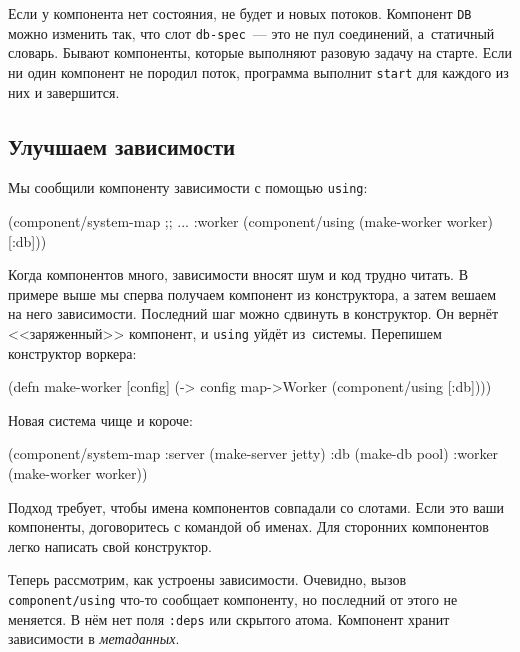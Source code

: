Если у компонента нет состояния, не будет и новых потоков. Компонент \verb|DB|
можно изменить так, что слот \verb|db-spec|~--- это не пул соединений, а~статичный
словарь. Бывают компоненты, которые выполняют разовую задачу на старте. Если ни
один компонент не породил поток, программа выполнит \verb|start| для каждого из
них и завершится.

\subsection{Улучшаем зависимости}


Мы сообщили компоненту зависимости с помощью \verb|using|:

\begin{english}
  \begin{clojure}
(component/system-map
 ;; ...
 :worker (component/using
          (make-worker worker) [:db]))
  \end{clojure}
\end{english}

Когда компонентов много, зависимости вносят шум и код трудно читать. В примере
выше мы сперва получаем компонент из конструктора, а затем вешаем на него
зависимости. Последний шаг можно сдвинуть в конструктор. Он вернёт
<<заряженный>> компонент, и \verb|using| уйдёт из~системы. Перепишем конструктор
воркера:

\begin{english}
  \begin{clojure}
(defn make-worker [config]
  (-> config map->Worker (component/using [:db])))
  \end{clojure}
\end{english}

\noindent
Новая система чище и короче:

\begin{english}
  \begin{clojure}
(component/system-map
 :server (make-server jetty)
 :db     (make-db pool)
 :worker (make-worker worker))
  \end{clojure}
\end{english}

Подход требует, чтобы имена компонентов совпадали со слотами. Если это ваши
компоненты, договоритесь с командой об именах. Для сторонних компонентов легко
написать свой конструктор.


Теперь рассмотрим, как устроены зависимости. Очевидно, вызов
\verb|component/using| что-то сообщает компоненту, но последний от этого не
меняется. В нём нет поля \verb|:deps| или скрытого атома. Компонент хранит
зависимости в \emph{метаданных}.

